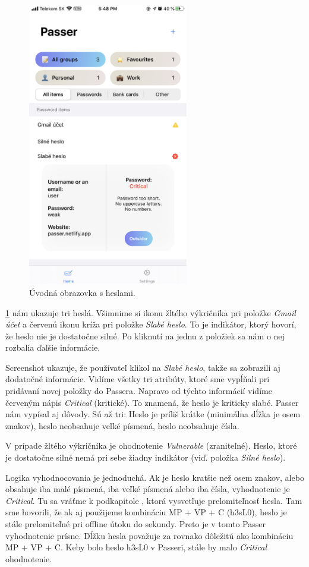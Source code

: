 \begin{figure}[H]
  \centering
  \includegraphics[width=7cm]{img/passer4.PNG}
  \caption{Úvodná obrazovka s heslami.}
  \label{passer4}
\end{figure}

\figurename{ \ref{passer4}} nám ukazuje tri heslá. Všimnime si ikonu žltého výkričníka pri položke \textit{Gmail účet} a červenú ikonu kríža pri položke \textit{Slabé heslo}. To je indikátor, ktorý hovorí, že heslo nie je dostatočne silné. Po kliknutí na jednu z položiek sa nám o nej rozbalia ďalšie informácie.

Screenshot ukazuje, že používateľ klikol na \textit{Slabé heslo}, takže sa zobrazili aj dodatočné informácie. Vidíme všetky tri atribúty, ktoré sme vypĺňali pri pridávaní novej položky do Passera. Napravo od týchto informácií vidíme červeným nápis \textit{Critical} (kritické). To znamená, že heslo je kriticky slabé. Passer nám vypísal aj dôvody. Sú až tri: Heslo je príliš krátke (minimálna dĺžka je osem znakov), heslo neobsahuje veľké písmená, heslo neobsahuje čísla.

V prípade žltého výkričníka je ohodnotenie \textit{Vulnerable} (zraniteľné). Heslo, ktoré je dostatočne silné nemá pri sebe žiadny indikátor (viď. položka \textit{Silné heslo}).

Logika vyhodnocovania je jednoduchá. Ak je heslo kratšie než osem znakov, alebo obsahuje iba malé písmená, iba veľké písmená alebo iba čísla, vyhodnotenie je \textit{Critical}. Tu sa vráťme k podkapitole , ktorá vysvetľuje prelomiteľnosť hesla. Tam sme hovorili, že ak aj použijeme kombináciu MP + VP + C (h3sL0), heslo je stále prelomiteľné pri offline útoku do sekundy. Preto je v tomto Passer vyhodnotenie prísne. Dĺžku hesla považuje za rovnako dôležitú ako kombináciu MP + VP + C. Keby bolo heslo h3sL0 v Passeri, stále by malo \textit{Critical} ohodnotenie.

